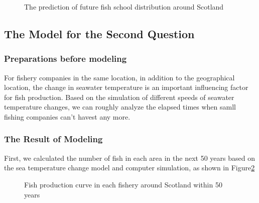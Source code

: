 \documentclass{mcmthesis}
\numberwithin{figure}{section}
\numberwithin{table}{section}
\begin{document}
\begin{figure}[H]
  \hspace{0in}
  \label{Dist}
  \caption{The prediction of future fish school distribution around Scotland}
  \end{figure}






\subsection{The Model for the Second Question}
\subsubsection{Preparations before modeling}
For fishery companies in the same location, in addition to the geographical location, the change in seawater temperature is an important influencing factor for fish production. Based on the simulation of different speeds of seawater temperature changes, we can roughly analyze the elapsed times when samll fishing companies can't havest any more.
\subsubsection{The Result of Modeling}
First, we calculated the number of fish in each area in the next 50 years based on the sea temperature change model and computer simulation, as shown in Figure\ref{FishProductionCurve}

\begin{figure}[tbp]
  \caption{Fish production curve in each fishery around Scotland within 50 years}\label{FishProductionCurve}
\end{figure}
\end{document}
